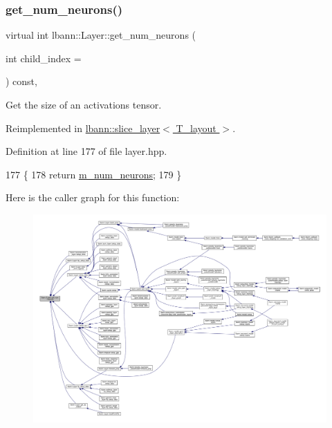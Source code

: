 \subsubsection{\texorpdfstring{get\+\_\+num\+\_\+neurons()}{get\_num\_neurons()}}
{\footnotesize\ttfamily virtual int lbann\+::\+Layer\+::get\+\_\+num\+\_\+neurons (\begin{DoxyParamCaption}\item[{int}]{child\+\_\+index = {} }\end{DoxyParamCaption}) const\hspace{0.3cm}{\ttfamily [inline]}, {\ttfamily [virtual]}}

Get the size of an activations tensor. 

Reimplemented in \hyperlink{classlbann_1_1slice__layer_ab36016849a59dfa23d37fd0cd2ec943c}{lbann\+::slice\+\_\+layer$<$ T\+\_\+layout $>$}.



Definition at line 177 of file layer.\+hpp.


\begin{DoxyCode}
177                                                          \{
178     \textcolor{keywordflow}{return} \hyperlink{classlbann_1_1Layer_a6b5ebc8a7d9329d8a773ed787e7b41d8}{m\_num\_neurons};
179   \}
\end{DoxyCode}
Here is the caller graph for this function\+:\nopagebreak
\begin{figure}[H]
\begin{center}
\leavevmode
\includegraphics[width=350pt]{classlbann_1_1Layer_aa4de686cc6c2dd38166f42faf874f227_icgraph}
\end{center}
\end{figure}
\mbox{\label{classlbann_1_1Layer_ac9290d4a6453ccda5f6b4d8b57b49ba3}} 

